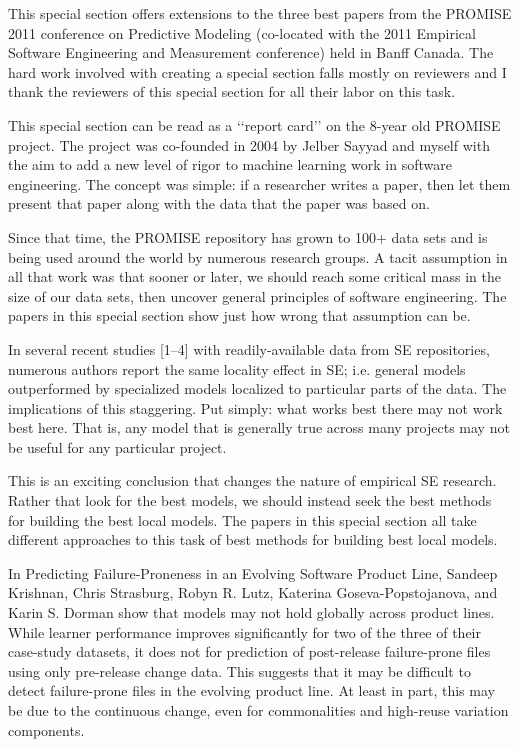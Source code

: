 
This special section offers extensions to the three best papers
from the PROMISE 2011 conference on Predictive Modeling
(co-located with the 2011 Empirical Software Engineering and
Measurement conference) held in Banff Canada. The hard work involved
with creating a special section falls mostly on reviewers and
I thank the reviewers of this special section for all their labor on
this task.

This special section can be read as a ‘‘report card’’ on the 8-year
old PROMISE project. The project was co-founded in 2004 by Jelber
Sayyad and myself with the aim to add a new level of rigor to
machine learning work in software engineering. The concept was
simple: if a researcher writes a paper, then let them present that
paper along with the data that the paper was based on.

Since that time, the PROMISE repository has grown to 100+ data
sets and is being used around the world by numerous research
groups. A tacit assumption in all that work was that sooner or later,
we should reach some critical mass in the size of our data sets, then
uncover general principles of software engineering. The papers in
this special section show just how wrong that assumption can be.

In several recent studies [1–4] with readily-available data from
SE repositories, numerous authors report the same locality effect in
SE; i.e. general models outperformed by specialized models localized
to particular parts of the data. The implications of this staggering.
Put simply: what works best there may not work best here.
That is, any model that is generally true across many projects
may not be useful for any particular project.

This is an exciting conclusion that changes the nature of empirical
SE research. Rather that look for the best models, we should
instead seek the best methods for building the best local models.
The papers in this special section all take different approaches to
this task of best methods for building best local models.

In Predicting Failure-Proneness in an Evolving Software Product
Line, Sandeep Krishnan, Chris Strasburg, Robyn R. Lutz, Katerina
Goseva-Popstojanova, and Karin S. Dorman show that models
may not hold globally across product lines. While learner
performance improves significantly for two of the three of their
case-study datasets, it does not for prediction of post-release failure-prone
files using only pre-release change data. This suggests
that it may be difficult to detect failure-prone files in the evolving
product line. At least in part, this may be due to the continuous
change, even for commonalities and high-reuse variation
components.

